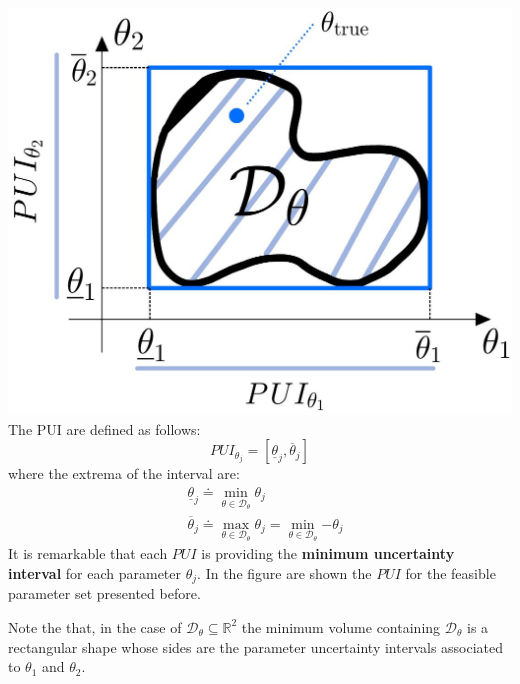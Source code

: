 \begin{multicols}{2}
    \includegraphics[scale=0.2]{img/PUI_1.jpeg}
    The PUI are defined as follows:
    \newcolumn
    \begin{equation}
        PUI_{\theta_j} = [\underline{\theta}_j,
        \overline{\theta}_j]
    \end{equation}
    where the extrema of the interval are:
    \begin{align}
        &\underline{\theta}_j \doteq \min_{\theta\in\mathcal{D}_\theta} {\theta_j}\\
        &\overline{\theta}_j \doteq \max_{\theta\in\mathcal{D}_\theta} {\theta_j} = \min_{\theta\in\mathcal{D}_\theta}{-\theta_j}
    \end{align}
    It is remarkable that each $PUI$ is providing the \textbf{minimum uncertainty interval} for each parameter $\theta_j$. In the figure are shown the $PUI$ for the feasible parameter set presented before.
\end{multicols}
\noindent 
Note the that, in the case of $\mathcal{D}_\theta \subseteq \mathbb{R}^2$ the minimum volume containing $\mathcal{D}_\theta$ is a rectangular shape whose sides are the parameter uncertainty intervals associated to $\theta_1$ and $\theta_2$.

